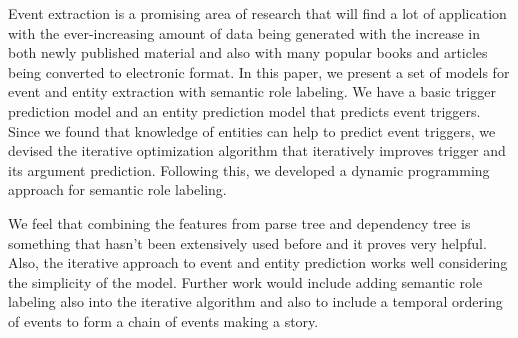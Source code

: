 Event extraction is a promising area of research that will find a lot of application with the ever-increasing amount of data being generated with the increase in both newly published material and also with many popular books and articles being converted to electronic format. In this paper, we present a set of models for event and entity extraction with semantic role labeling. We have a basic trigger prediction model and an entity prediction model that predicts event triggers. Since we found that knowledge of entities can help to predict event triggers, we devised the iterative optimization algorithm that iteratively improves trigger and its argument prediction. Following this, we developed a dynamic programming approach for semantic role labeling.

We feel that combining the features from parse tree and dependency tree is something that hasn't been extensively used before and it proves very helpful. Also, the iterative approach to event and entity prediction works well considering the simplicity of the model. Further work would include adding semantic role labeling also into the iterative algorithm and also to include a temporal ordering of events to form a chain of events making a story.